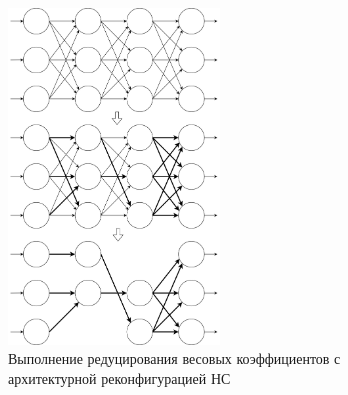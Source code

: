 \begin{figure}[H]
  \centering
  \includegraphics[width=0.5\textwidth]{man-source/images/ch2/pic2-3.png}
  \caption{Выполнение редуцирования весовых коэффициентов с архитектурной реконфигурацией НС}
  \label{fig:pic2_3}
\end{figure}


	

